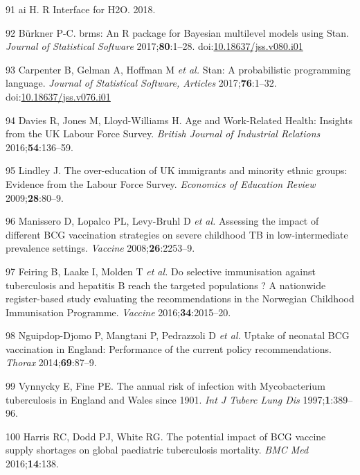 \documentclass[11pt,twoside]{bristolthesis}
\begin{document}
  \leavevmode\hypertarget{ref-h2o2018}{}%
  91 ai H. R Interface for H2O. 2018.
  
  \leavevmode\hypertarget{ref-Burkner}{}%
  92 Bürkner P-C. brms: An R package for Bayesian multilevel models using Stan. \emph{Journal of Statistical Software} 2017;\textbf{80}:1--28. doi:\href{https://doi.org/10.18637/jss.v080.i01}{10.18637/jss.v080.i01}
  
  \leavevmode\hypertarget{ref-StanDevelopmentTeam2016}{}%
  93 Carpenter B, Gelman A, Hoffman M \emph{et al.} Stan: A probabilistic programming language. \emph{Journal of Statistical Software, Articles} 2017;\textbf{76}:1--32. doi:\href{https://doi.org/10.18637/jss.v076.i01}{10.18637/jss.v076.i01}
  
  \leavevmode\hypertarget{ref-Davies2016a}{}%
  94 Davies R, Jones M, Lloyd-Williams H. Age and Work-Related Health: Insights from the UK Labour Force Survey. \emph{British Journal of Industrial Relations} 2016;\textbf{54}:136--59.
  
  \leavevmode\hypertarget{ref-Lindley2009}{}%
  95 Lindley J. The over-education of UK immigrants and minority ethnic groups: Evidence from the Labour Force Survey. \emph{Economics of Education Review} 2009;\textbf{28}:80--9.
  
  \leavevmode\hypertarget{ref-Manissero2008}{}%
  96 Manissero D, Lopalco PL, Levy-Bruhl D \emph{et al.} Assessing the impact of different BCG vaccination strategies on severe childhood TB in low-intermediate prevalence settings. \emph{Vaccine} 2008;\textbf{26}:2253--9.
  
  \leavevmode\hypertarget{ref-Feiring2016}{}%
  97 Feiring B, Laake I, Molden T \emph{et al.} Do selective immunisation against tuberculosis and hepatitis B reach the targeted populations ? A nationwide register-based study evaluating the recommendations in the Norwegian Childhood Immunisation Programme. \emph{Vaccine} 2016;\textbf{34}:2015--20.
  
  \leavevmode\hypertarget{ref-Nguipdop-Djomo2014}{}%
  98 Nguipdop-Djomo P, Mangtani P, Pedrazzoli D \emph{et al.} Uptake of neonatal BCG vaccination in England: Performance of the current policy recommendations. \emph{Thorax} 2014;\textbf{69}:87--9.
  
  \leavevmode\hypertarget{ref-Vynnycky1997a}{}%
  99 Vynnycky E, Fine PE. The annual risk of infection with Mycobacterium tuberculosis in England and Wales since 1901. \emph{Int J Tuberc Lung Dis} 1997;\textbf{1}:389--96.
  
  \leavevmode\hypertarget{ref-Harris2016}{}%
  100 Harris RC, Dodd PJ, White RG. The potential impact of BCG vaccine supply shortages on global paediatric tuberculosis mortality. \emph{BMC Med} 2016;\textbf{14}:138.
  
\end{document}
